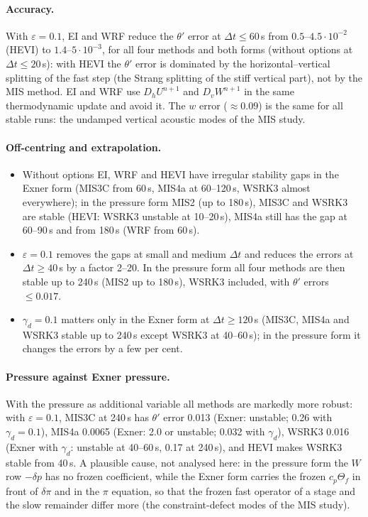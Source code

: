 \documentclass[11pt,a4paper]{article}
\begin{document}
\paragraph{Accuracy.} With $\varepsilon=0.1$, EI and WRF reduce the $\theta'$ error at $\Delta t\le60$\,s from
$0.5$--$4.5\cdot10^{-2}$ (HEVI) to $1.4$--$5\cdot10^{-3}$, for all four methods and both forms (without options at
$\Delta t\le20$\,s): with HEVI the $\theta'$
error is dominated by the horizontal--vertical splitting of the fast step (the Strang splitting of the
stiff vertical part), not by the MIS method. EI and WRF use $D_hU^{n+1}$ and $D_vW^{n+1}$ in the same
thermodynamic update and avoid it. The $w$ error ($\approx0.09$) is the same for all stable runs: the undamped
vertical acoustic modes of the MIS study.

\paragraph{Off-centring and extrapolation.}
\begin{itemize}
\item Without options EI, WRF and HEVI have irregular stability gaps in the Exner form (MIS3C from 60\,s,
MIS4a at 60--120\,s, WSRK3 almost everywhere); in the pressure form MIS2 (up to 180\,s), MIS3C and
WSRK3 are stable (HEVI: WSRK3 unstable at 10--20\,s), MIS4a still has the gap at 60--90\,s and from 180\,s
(WRF from 60\,s).
\item $\varepsilon=0.1$ removes the gaps at small and medium $\Delta t$ and reduces the errors at $\Delta t\ge40$\,s by a factor 2--20. In
the pressure form all four methods are then stable up to 240\,s (MIS2 up to 180\,s), WSRK3 included,
with $\theta'$ errors $\le0.017$.
\item $\gamma_d=0.1$ matters only in the Exner form at $\Delta t\ge120$\,s (MIS3C, MIS4a and WSRK3 stable up to 240\,s
except WSRK3 at 40--60\,s); in the pressure form it changes the errors by a few per cent.
\end{itemize}

\paragraph{Pressure against Exner pressure.} With the pressure as additional variable all methods are
markedly more robust: with $\varepsilon=0.1$, MIS3C at 240\,s has $\theta'$ error 0.013 (Exner: unstable; 0.26 with
$\gamma_d=0.1$), MIS4a 0.0065 (Exner: 2.0 or unstable; 0.032 with $\gamma_d$), WSRK3 0.016 (Exner with $\gamma_d$: unstable at
40--60\,s, 0.17 at 240\,s), and HEVI makes
WSRK3 stable from 40\,s. A plausible cause, not analysed here: in the pressure form the $W$ row $-\delta p$ has
no frozen coefficient, while the Exner form carries the frozen $c_p\Theta_f$ in front of $\delta\pi$ and in the
$\pi$ equation, so that the frozen fast operator of a stage and the slow remainder differ more (the
constraint-defect modes of the MIS study).
\end{document}
